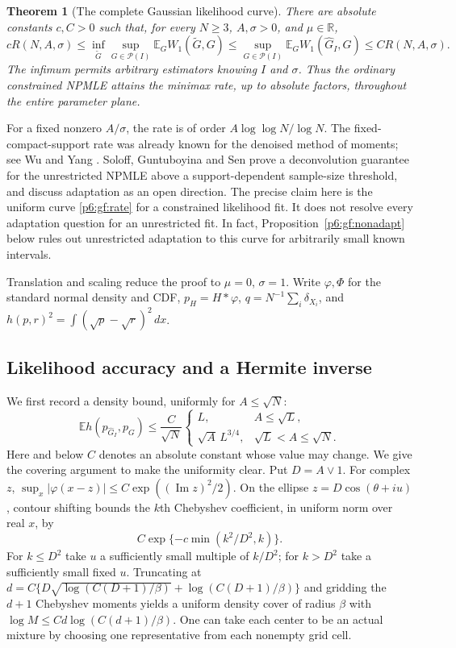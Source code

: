 \documentclass[11pt,a4paper]{article}
\newtheorem{theorem}{Theorem}[section]
\theoremstyle{definition}
\theoremstyle{remark}
\numberwithin{equation}{section}
\begin{document}
\begin{theorem}[The complete Gaussian likelihood curve]\label{p6:gf:main}
There are absolute constants $c,C>0$ such that, for every $N\ge3$,
$A,\sigma>0$, and $\mu\in\mathbb R$,
\[
 cR(N,A,\sigma)\le
 \inf_{\widetilde G}\sup_{G\in\mathcal P(I)}
             \mathbb E_G W_1(\widetilde G,G)
 \le\sup_{G\in\mathcal P(I)}
             \mathbb E_G W_1(\widehat G_I,G)
 \le CR(N,A,\sigma).
\]
The infimum permits arbitrary estimators knowing $I$ and $\sigma$.
Thus the ordinary constrained NPMLE attains the minimax rate,
up to absolute factors, throughout the entire parameter plane.
\end{theorem}

For a fixed nonzero $A/\sigma$, the rate is of order
$A\log\log N/\log N$.  The fixed-compact-support rate was already
known for the denoised method of moments; see Wu and Yang
\cite[Theorem 5 and Proposition 8]{p6:GF_WY2020}.
Soloff, Guntuboyina and Sen \cite[Theorem 11 and Remark 12]{p7:HO_SGSpreprint}
prove a deconvolution guarantee for the unrestricted NPMLE above a
support-dependent sample-size threshold, and discuss adaptation as
an open direction.  The precise claim here is the uniform curve
\eqref{p6:gf:rate} for a constrained likelihood fit.  It does not resolve
every adaptation question for an unrestricted fit.  In fact,
Proposition~\ref{p6:gf:nonadapt} below rules out unrestricted adaptation
to this curve for arbitrarily small known intervals.

Translation and scaling reduce the proof to $\mu=0$, $\sigma=1$.
Write $\varphi,\Phi$ for the standard normal density and CDF,
$p_H=H*\varphi$, $q=N^{-1}\sum_i\delta_{X_i}$, and
$h(p,r)^2=\int(\sqrt p-\sqrt r)^2\,dx$.

\subsection{Likelihood accuracy and a Hermite inverse}

We first record a density bound, uniformly for $A\le\sqrt N$:
\begin{equation}\label{p6:gf:density}
 \mathbb E h(p_{\widehat G_I},p_G)
 \le \frac C{\sqrt N}
       \begin{cases}L,&A\le\sqrt L,\\
                      \sqrt A\,L^{3/4},&\sqrt L<A\le\sqrt N.
       \end{cases}
\end{equation}
Here and below $C$ denotes an absolute constant whose value may
change.  We give the covering argument to make the uniformity clear.
Put $D=A\vee1$.  For complex $z$,
$\sup_x|\varphi(x-z)|\le C\exp((\operatorname{Im}z)^2/2)$.
On the ellipse $z=D\cos(\theta+iu)$, contour shifting bounds the
$k$th Chebyshev coefficient, in uniform norm over real $x$, by
\[
                   C\exp\{-c\min(k^2/D^2,k)\}.
\]
For $k\le D^2$ take $u$ a sufficiently small multiple of $k/D^2$;
for $k>D^2$ take a sufficiently small fixed $u$.
Truncating at
$d=C\{D\sqrt{\log(C(D+1)/\beta)}+\log(C(D+1)/\beta)\}$
and gridding the $d+1$ Chebyshev moments yields a uniform density
cover of radius $\beta$ with $\log M\le Cd\log(C(d+1)/\beta)$.
One can take each center to be an actual mixture by choosing one
representative from each nonempty grid cell.
\end{document}
